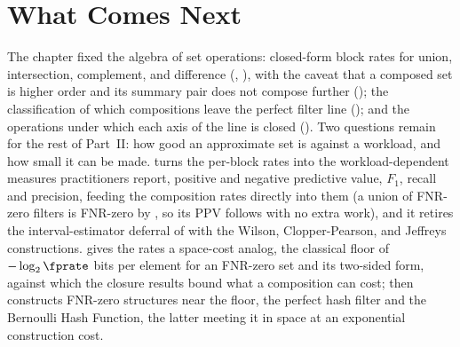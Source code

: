 %

\section{What Comes Next}
\label{sec:ch6-what-comes-next}

The chapter fixed the algebra of set operations: closed-form block rates for
union, intersection, complement, and difference (,
), with the caveat that a composed set is higher
order and its summary pair does not compose further
(); the classification of which compositions
leave the perfect filter line (); and the operations
under which each axis of the line is closed (). Two questions remain for
the rest of Part~II: how good an approximate set is against a workload, and
how small it can be made.  turns the per-block
rates into the workload-dependent measures practitioners report, positive and
negative predictive value, $F_1$, recall and precision, feeding the
composition rates directly into them (a union of FNR-zero filters is
FNR-zero by , so its PPV follows with no extra
work), and it retires the interval-estimator deferral of
 with the Wilson, Clopper-Pearson, and Jeffreys
constructions.  gives the rates a space-cost
analog, the classical floor of $-\log_2 \fprate$ bits per element for an
FNR-zero set and its two-sided form, against which the closure results bound
what a composition can cost;  then constructs FNR-zero structures near
the floor, the perfect hash filter and the Bernoulli Hash Function, the
latter meeting it in space at an exponential construction cost.
